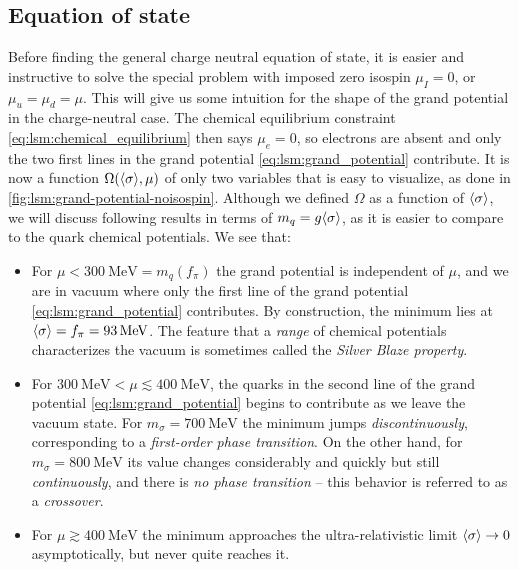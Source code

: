 \subsection{Equation of state}

Before finding the general charge neutral equation of state,
it is easier and instructive to solve the special problem with imposed zero isospin $\mu_I=0$, or $\mu_u=\mu_d=\mu$.
This will give us some intuition for the shape of the grand potential in the charge-neutral case.
The chemical equilibrium constraint \eqref{eq:lsm:chemical_equilibrium} then says $\mu_e=0$,
so electrons are absent and only the two first lines in the grand potential \eqref{eq:lsm:grand_potential} contribute.
It is now a function $\Omega(\langle \sigma \rangle,\mu)$ of only two variables that is easy to visualize, as done in \cref{fig:lsm:grand-potential-noisospin}.
Although we defined $\Omega$ as a function of $\langle \sigma \rangle$, we will discuss following results in terms of $m_q = g \langle \sigma \rangle$, as it is easier to compare to the quark chemical potentials.
We see that:
\begin{itemize}
\item For $\mu < \SI{300}{\mega\electronvolt} = m_q(f_\pi)$ the grand potential is independent of $\mu$,
      and we are in vacuum where only the first line of the grand potential \eqref{eq:lsm:grand_potential} contributes.
      By construction, the minimum lies at $\langle \sigma \rangle = f_\pi = \SI{93}{\mega\electronvolt}$.
      The feature that a \emph{range} of chemical potentials characterizes the vacuum is sometimes called the \emph{Silver Blaze property}.
\item For $\SI{300}{\mega\electronvolt} < \mu \lesssim \SI{400}{\mega\electronvolt}$,
      the quarks in the second line of the grand potential \eqref{eq:lsm:grand_potential} begins to contribute as we leave the vacuum state.
      For $m_\sigma = \SI{700}{\mega\electronvolt}$ the minimum jumps \emph{discontinuously}, corresponding to a \emph{first-order phase transition}.
      On the other hand, for $m_\sigma = \SI{800}{\mega\electronvolt}$ its value changes considerably and quickly but still \emph{continuously},
      and there is \emph{no phase transition} -- this behavior is referred to as a \emph{crossover}.
\item For $\mu \gtrsim \SI{400}{\mega\electronvolt}$ the minimum approaches the ultra-relativistic limit $\langle \sigma \rangle \rightarrow 0$ asymptotically,
      but never quite reaches it.
\end{itemize}

